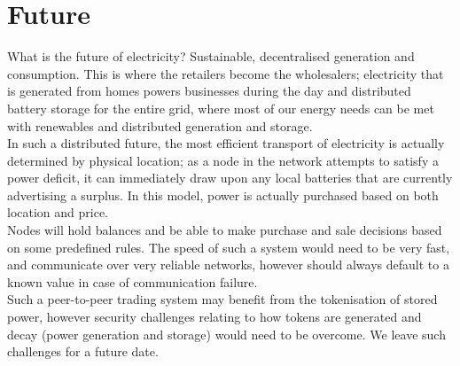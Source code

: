 \documentclass{article}
\theoremstyle{definition}
\theoremstyle{plain} %
\begin{document}




\pagebreak
\section{Future}

What is the future of electricity? Sustainable, decentralised generation and consumption. This is where the retailers become the wholesalers; electricity that is generated from homes powers businesses during the day and distributed battery storage for the entire grid, where most of our energy needs can be met with renewables and distributed generation and storage. \\

\noindent In such a distributed future, the most efficient transport of electricity is actually determined by physical location; as a node in the network attempts to satisfy a power deficit, it can immediately draw upon any local batteries that are currently advertising a surplus. In this model, power is actually purchased based on both location and price.\\

\noindent Nodes will hold balances and be able to make purchase and sale decisions based on some predefined rules. The speed of such a system would need to be very fast, and communicate over very reliable networks, however should always default to a known value in case of communication failure.\\

\noindent Such a peer-to-peer trading system may benefit from the tokenisation of stored power, however security challenges relating to how tokens are generated and decay (power generation and storage) would need to be overcome. We leave such challenges for a future date.\\
\end{document}
